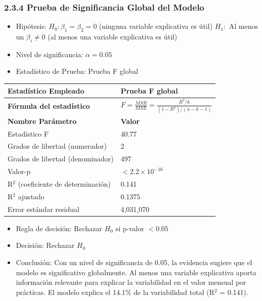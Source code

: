 \documentclass[12pt,a4paper]{article}
\begin{document}
\subsubsection*{2.3.4 Prueba de Significancia Global del Modelo}

\begin{itemize}
    \item Hipótesis: \quad $H_0: \beta_1 = \beta_2 = 0$ (ninguna variable explicativa es útil) \hspace{1cm} $H_1:$ Al menos un $\beta_i \neq 0$ (al menos una variable explicativa es útil)
    \item Nivel de significancia: $\alpha = 0.05$
    \item Estadístico de Prueba: Prueba F global
\end{itemize}

\begin{tabular}{|m{7cm}|m{7cm}|}
\hline
\textbf{Estadístico Empleado} & Prueba F global \\ \hline
\textbf{Fórmula del estadístico} & $F = \frac{MSR}{MSE} = \frac{R^2/k}{(1-R^2)/(n-k-1)}$ \\ \hline
\textbf{Nombre Parámetro} & \textbf{Valor} \\ \hline
Estadístico F & 40.77 \\ \hline
Grados de libertad (numerador) & 2 \\ \hline
Grados de libertad (denominador) & 497 \\ \hline
Valor-p & $< 2.2 \times 10^{-16}$ \\ \hline
R$^2$ (coeficiente de determinación) & 0.141 \\ \hline
R$^2$ ajustado & 0.1375 \\ \hline
Error estándar residual & 4,031,070 \\ \hline
\end{tabular}

\begin{itemize}
    \item Regla de decisión: Rechazar $H_0$ si p-valor $< 0.05$
    \item Decisión: Rechazar $H_0$
    \item Conclusión: Con un nivel de significancia de 0.05, la evidencia sugiere que el modelo es significativo globalmente. Al menos una variable explicativa aporta información relevante para explicar la variabilidad en el valor mensual por prácticas. El modelo explica el 14.1\% de la variabilidad total (R$^2$ = 0.141).
\end{itemize}
\end{document}
